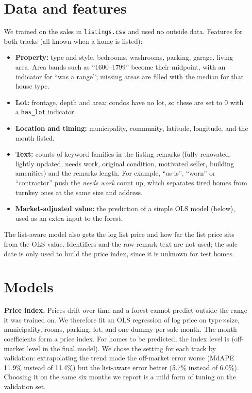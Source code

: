 \documentclass[11pt]{article}
\begin{document}
\section{Data and features}
We trained on the \nTrain{} sales in \texttt{listings.csv} and used no outside data. Features for both tracks (all known when a home is listed):
\begin{itemize}\setlength\itemsep{0pt}
\item \textbf{Property:} type and style, bedrooms, washrooms, parking, garage, living area. Area bands such as ``1600--1799'' become their midpoint, with an indicator for ``was a range''; missing areas are filled with the median for that house type.
\item \textbf{Lot:} frontage, depth and area; condos have no lot, so these are set to 0 with a \texttt{has\_lot} indicator.
\item \textbf{Location and timing:} municipality, community, latitude, longitude, and the month listed.
\item \textbf{Text:} counts of keyword families in the listing remarks (fully renovated, lightly updated, needs work, original condition, motivated seller, building amenities) and the remarks length. For example, ``as-is'', ``worn'' or ``contractor'' push the \emph{needs work} count up, which separates tired homes from turnkey ones at the same size and address.
\item \textbf{Market-adjusted value:} the prediction of a simple OLS model (below), used as an extra input to the forest.
\end{itemize}
The list-aware model also gets the log list price and how far the list price sits from the OLS value. Identifiers and the raw remark text are not used; the sale date is only used to build the price index, since it is unknown for test homes.

\section{Models}
\textbf{Price index.} Prices drift over time and a forest cannot predict outside the range it was trained on. We therefore fit an OLS regression of log price on type$\times$size, municipality, rooms, parking, lot, and one dummy per sale month. The month coefficients form a price index. For homes to be predicted, the index level is \trendUsed{} (off-market level \indexLevel{} in the final model). We chose the setting for each track by validation: extrapolating the trend made the off-market error worse (MdAPE 11.9\% instead of 11.4\%) but the list-aware error better (5.7\% instead of 6.0\%). Choosing it on the same six months we report is a mild form of tuning on the validation set.
\end{document}
